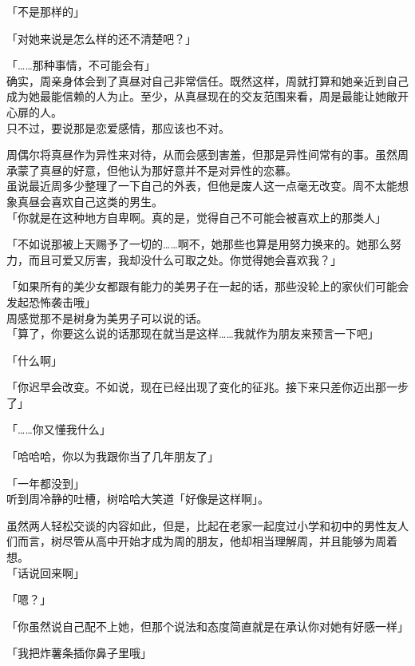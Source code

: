 「不是那样的」

「对她来说是怎么样的还不清楚吧？」

「……那种事情，不可能会有」\\

确实，周亲身体会到了真昼对自己非常信任。既然这样，周就打算和她亲近到自己成为她最能信赖的人为止。至少，从真昼现在的交友范围来看，周是最能让她敞开心扉的人。\\

只不过，要说那是恋爱感情，那应该也不对。

周偶尔将真昼作为异性来对待，从而会感到害羞，但那是异性间常有的事。虽然周承蒙了真昼的好意，但他认为那好意并不是对异性的恋慕。\\

虽说最近周多少整理了一下自己的外表，但他是废人这一点毫无改变。周不太能想象真昼会喜欢自己这类的男生。\\

「你就是在这种地方自卑啊。真的是，觉得自己不可能会被喜欢上的那类人」

「不如说那被上天赐予了一切的……啊不，她那些也算是用努力换来的。她那么努力，而且可爱又厉害，我却没什么可取之处。你觉得她会喜欢我？」

「如果所有的美少女都跟有能力的美男子在一起的话，那些没轮上的家伙们可能会发起恐怖袭击哦」\\

周感觉那不是树身为美男子可以说的话。\\

「算了，你要这么说的话那现在就当是这样……我就作为朋友来预言一下吧」

「什么啊」

「你迟早会改变。不如说，现在已经出现了变化的征兆。接下来只差你迈出那一步了」

「……你又懂我什么」

「哈哈哈，你以为我跟你当了几年朋友了」

「一年都没到」\\

听到周冷静的吐槽，树哈哈大笑道「好像是这样啊」。

虽然两人轻松交谈的内容如此，但是，比起在老家一起度过小学和初中的男性友人们而言，树尽管从高中开始才成为周的朋友，他却相当理解周，并且能够为周着想。\\

「话说回来啊」

「嗯？」

「你虽然说自己配不上她，但那个说法和态度简直就是在承认你对她有好感一样」

「我把炸薯条插你鼻子里哦」

